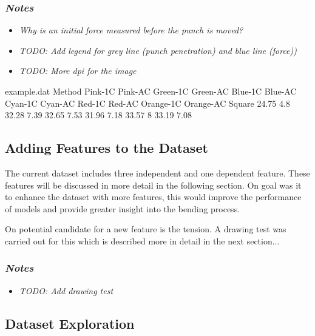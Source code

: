\subsubsection*{\textit{Notes}}
\begin{itemize}
    \item \textit{Why is an initial force measured before the punch is moved?}
    \item \textit{TODO: Add legend for grey line (punch penetration) and blue line (force))}
    \item \textit{TODO: More dpi for the image}
\end{itemize}


\begin{filecontents*}{example.dat}
    Method Pink-1C Pink-AC Green-1C Green-AC Blue-1C Blue-AC Cyan-1C Cyan-AC Red-1C Red-AC
    Orange-1C Orange-AC
    Square 24.75 4.8 32.28 7.39 32.65 7.53 31.96 7.18 33.57 8 33.19 7.08
\end{filecontents*}


\label{sec:dataset_exploration}

\subsection{Adding Features to the Dataset}\label{subsec:adding-features-to-the-dataset}
The current dataset includes three independent and one dependent feature. These features
will be discussed in more detail in the following section.
On goal was it to enhance the dataset with more features, this would improve
the performance of models and provide greater insight into the bending process.

On potential candidate for a new feature is the tension. A drawing test was carried out for this
which is described more in detail in the next section...

\subsubsection*{\textit{Notes}}
\begin{itemize}
    \item \textit{TODO: Add drawing test}
\end{itemize}

\subsection{Dataset Exploration}\label{subsec:dataset-exploration}

